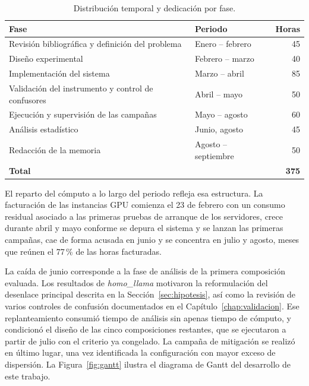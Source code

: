 \begin{table}[htbp]
	\centering
	\caption{Distribución temporal y dedicación por fase.}
	\label{tab:planificacion}
	\small
	\begin{tabular}{p{6.6cm} p{3.4cm} r}
		\hline
		\textbf{Fase} & \textbf{Periodo} & \textbf{Horas} \\
		\hline
		Revisión bibliográfica y definición del problema & Enero -- febrero & 45 \\
		Diseño experimental & Febrero -- marzo & 40 \\
		Implementación del sistema & Marzo -- abril & 85 \\
		Validación del instrumento y control de confusores & Abril -- mayo & 50 \\
		Ejecución y supervisión de las campañas & Mayo -- agosto & 60 \\
		Análisis estadístico & Junio, agosto & 45 \\
		Redacción de la memoria & Agosto -- septiembre & 50 \\
		\hline
		\textbf{Total} & & \textbf{375} \\
		\hline
	\end{tabular}
\end{table}

El reparto del cómputo a lo largo del periodo refleja esa estructura. La facturación de las instancias GPU comienza el 23 de febrero con un consumo residual asociado a las primeras pruebas de arranque de los servidores, crece durante abril y mayo conforme se depura el sistema y se lanzan las primeras campañas, cae de forma acusada en junio y se concentra en julio y agosto, meses que reúnen el 77\,\% de las horas facturadas.

La caída de junio corresponde a la fase de análisis de la primera composición evaluada. Los resultados de \textit{homo\_llama} motivaron la reformulación del desenlace principal descrita en la Sección~\ref{sec:hipotesis}, así como la revisión de varios controles de confusión documentados en el Capítulo~\ref{chap:validacion}. Ese replanteamiento consumió tiempo de análisis sin apenas tiempo de cómputo, y condicionó el diseño de las cinco composiciones restantes, que se ejecutaron a partir de julio con el criterio ya congelado. La campaña de mitigación se realizó en último lugar, una vez identificada la configuración con mayor exceso de dispersión. La Figura~\ref{fig:gantt} ilustra el diagrama de Gantt del desarrollo de este trabajo.

